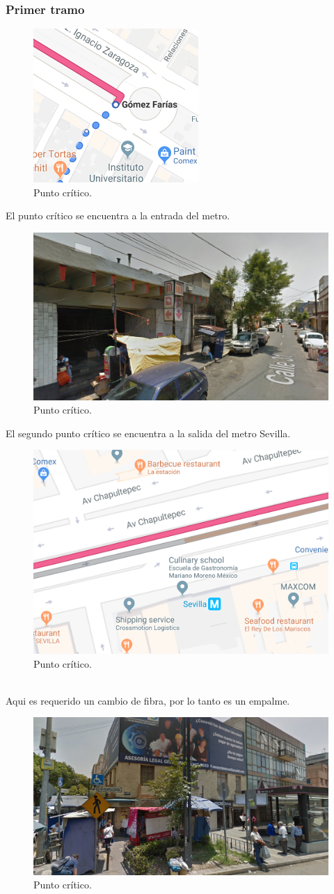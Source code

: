 \documentclass[12pt,letterpaper]{article}
\begin{document}
\subsubsection{Primer tramo}
\begin{figure}[ht]
    \centering
    \includegraphics[width=.4\textwidth]{f24.png}
    \caption{Punto crítico.}
\end{figure}
El punto crítico se encuentra a la entrada del metro.
\begin{figure}[ht]
    \centering
    \includegraphics[width=.7\textwidth]{f25.png}
    \caption{Punto crítico.}
\end{figure}

\newpage
El segundo punto crítico se encuentra a la salida del metro Sevilla.
\begin{figure}[ht]
    \centering
    \includegraphics[width=.4\textwidth]{f26.png}
    \caption{Punto crítico.}
\end{figure}
\\
Aqui es requerido un cambio de fibra, por lo tanto es un empalme.
\begin{figure}[ht]
    \centering
    \includegraphics[width=.5\textwidth]{f27.png}
    \caption{Punto crítico.}
\end{figure}
\end{document}
